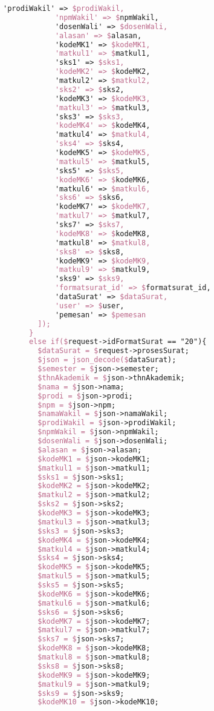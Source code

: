 \begin{lstlisting}[language=tex,basicstyle=\tiny,caption=PesanansuratController.php]
            'prodiWakil' => $prodiWakil,
            'npmWakil' => $npmWakil,
            'dosenWali' => $dosenWali,
            'alasan' => $alasan,
            'kodeMK1' => $kodeMK1,
            'matkul1' => $matkul1,
            'sks1' => $sks1,
            'kodeMK2' => $kodeMK2,
            'matkul2' => $matkul2,
            'sks2' => $sks2,
            'kodeMK3' => $kodeMK3,
            'matkul3' => $matkul3,
            'sks3' => $sks3,
            'kodeMK4' => $kodeMK4,
            'matkul4' => $matkul4,
            'sks4' => $sks4,
            'kodeMK5' => $kodeMK5,
            'matkul5' => $matkul5,
            'sks5' => $sks5,
            'kodeMK6' => $kodeMK6,
            'matkul6' => $matkul6,
            'sks6' => $sks6,
            'kodeMK7' => $kodeMK7,
            'matkul7' => $matkul7,
            'sks7' => $sks7,
            'kodeMK8' => $kodeMK8,
            'matkul8' => $matkul8,
            'sks8' => $sks8,
            'kodeMK9' => $kodeMK9,
            'matkul9' => $matkul9,
            'sks9' => $sks9,
            'formatsurat_id' => $formatsurat_id,
            'dataSurat' => $dataSurat,
            'user' => $user,
            'pemesan' => $pemesan
        ]);
      }
      else if($request->idFormatSurat == "20"){
        $dataSurat = $request->prosesSurat;
        $json = json_decode($dataSurat);
        $semester = $json->semester;
        $thnAkademik = $json->thnAkademik;
        $nama = $json->nama;
        $prodi = $json->prodi;
        $npm = $json->npm;
        $namaWakil = $json->namaWakil;
        $prodiWakil = $json->prodiWakil;
        $npmWakil = $json->npmWakil;
        $dosenWali = $json->dosenWali;
        $alasan = $json->alasan;
        $kodeMK1 = $json->kodeMK1;
        $matkul1 = $json->matkul1;
        $sks1 = $json->sks1;
        $kodeMK2 = $json->kodeMK2;
        $matkul2 = $json->matkul2;
        $sks2 = $json->sks2;
        $kodeMK3 = $json->kodeMK3;
        $matkul3 = $json->matkul3;
        $sks3 = $json->sks3;
        $kodeMK4 = $json->kodeMK4;
        $matkul4 = $json->matkul4;
        $sks4 = $json->sks4;
        $kodeMK5 = $json->kodeMK5;
        $matkul5 = $json->matkul5;
        $sks5 = $json->sks5;
        $kodeMK6 = $json->kodeMK6;
        $matkul6 = $json->matkul6;
        $sks6 = $json->sks6;
        $kodeMK7 = $json->kodeMK7;
        $matkul7 = $json->matkul7;
        $sks7 = $json->sks7;
        $kodeMK8 = $json->kodeMK8;
        $matkul8 = $json->matkul8;
        $sks8 = $json->sks8;
        $kodeMK9 = $json->kodeMK9;
        $matkul9 = $json->matkul9;
        $sks9 = $json->sks9;
        $kodeMK10 = $json->kodeMK10;

\end{lstlisting}
